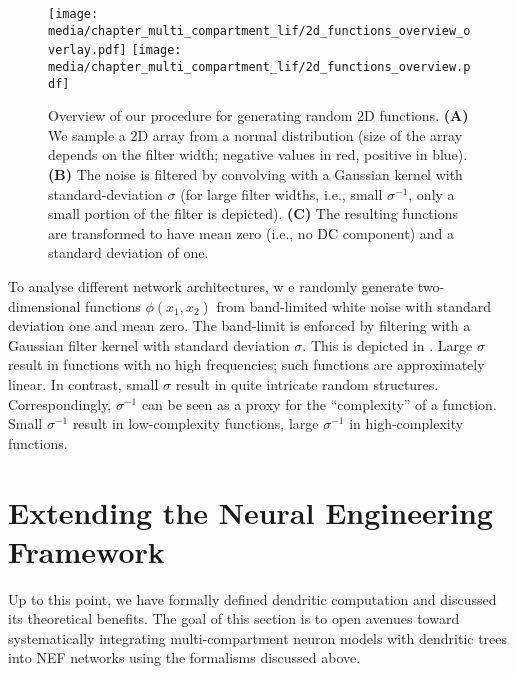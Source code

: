\begin{figure}
	\texttt{[image: media/chapter\_multi\_compartment\_lif/2d\_functions\_overview\_overlay.pdf]}%
	\kern-157.24mm\texttt{[image: media/chapter\_multi\_compartment\_lif/2d\_functions\_overview.pdf]}
	\caption[Overview of our procedure for generating random 2D functions]{Overview of our procedure for generating random 2D functions. \textbf{(A)} We sample a 2D array from a normal distribution (size of the array depends on the filter width; negative values in red, positive in blue). \textbf{(B)} The noise is filtered by convolving with a Gaussian kernel with standard-deviation $\sigma$ (for large filter widths, i.e., small $\sigma^{-1}$, only a small portion of the filter is depicted). \textbf{(C)} The resulting functions are transformed to have mean zero (i.e., no DC component) and a standard deviation of one.}
	\label{fig:2d_functions_overview}
\end{figure}

To analyse different network architectures, w
e randomly generate two-dimensional functions $\phi(x_1, x_2)$ from band-limited white noise with standard deviation one and mean zero.
The band-limit is enforced by filtering with a Gaussian filter kernel with standard deviation $\sigma$.
This is depicted in .
Large $\sigma$ result in functions with no high frequencies; such functions are approximately linear.
In contrast, small $\sigma$ result in quite intricate random structures.
Correspondingly, $\sigma^{-1}$ can be seen as a proxy for the \enquote{complexity} of a function.
Small $\sigma^{-1}$ result in low-complexity functions, large $\sigma^{-1}$ in high-complexity functions.


\clearpage

\section{Extending the Neural Engineering Framework}

Up to this point, we have formally defined dendritic computation and discussed its theoretical benefits.
The goal of this section is to open avenues toward systematically integrating multi-compartment neuron models with dendritic trees into NEF networks using the formalisms discussed above.

